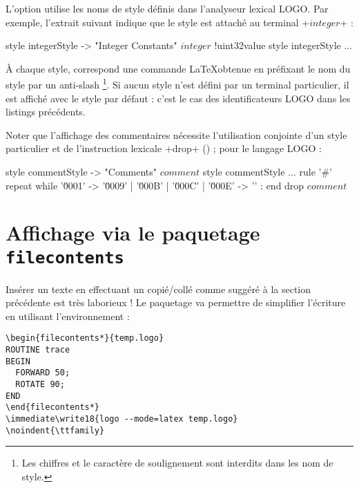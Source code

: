 
L'option  utilise les noms de style définis dans l'analyseur lexical LOGO. Par exemple, l'extrait suivant indique que le style  est attaché au terminal \ggs+$integer$+ :

\begin{galgas}
style integerStyle -> "Integer Constants"
$integer$ !uint32value style integerStyle ...
\end{galgas}

À chaque style, correspond une commande \LaTeX obtenue en préfixant le nom du style par un anti-slash \tpp{\textbackslash}\footnote{Les chiffres et le caractère de soulignement \tpp{\_} sont interdits dans les nom de style.}. Si aucun style n'est défini par un terminal particulier, il est affiché avec le style par défaut : c'est le cas des identificateurs LOGO dans les listings précédents.

Noter que l'affichage des commentaires nécessite l'utilisation conjointe d'un style particulier et de l'instruction lexicale \ggs+drop+ () ; pour le langage LOGO :

\begin{galgas}
style commentStyle -> "Comments"
$comment$ style commentStyle ...
rule '#' {
  repeat
  while '\u0001' -> '\u0009' | '\u000B' | '\u000C' | '\u000E' -> '\uFFFD' :
  end
  drop $comment$
}
\end{galgas}







\section{Affichage via le paquetage \texttt{f{}ilecontents}}

Insérer un texte en effectuant un copié/collé comme suggéré à la section précédente est très laborieux ! Le paquetage  va permettre de simplifier l'écriture en utilisant l'environnement  :

\begin{verbatim}
\begin{filecontents*}{temp.logo}
ROUTINE trace
BEGIN
  FORWARD 50;
  ROTATE 90;
END
\end{filecontents*}
\immediate\write18{logo --mode=latex temp.logo}
\noindent{\ttfamily}
\end{verbatim}

